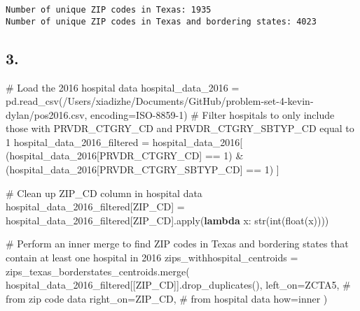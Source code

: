 \documentclass[
  letterpaper,
  DIV=11,
  numbers=noendperiod]{scrartcl}
\newenvironment{Shaded}{\begin{snugshade}}{\end{snugshade}}
\newcommand{\BuiltInTok}[1]{\textcolor[rgb]{0.00,0.23,0.31}{#1}}
\newcommand{\CommentTok}[1]{\textcolor[rgb]{0.37,0.37,0.37}{#1}}
\newcommand{\DecValTok}[1]{\textcolor[rgb]{0.68,0.00,0.00}{#1}}
\newcommand{\KeywordTok}[1]{\textcolor[rgb]{0.00,0.23,0.31}{\textbf{#1}}}
\newcommand{\NormalTok}[1]{\textcolor[rgb]{0.00,0.23,0.31}{#1}}
\newcommand{\OperatorTok}[1]{\textcolor[rgb]{0.37,0.37,0.37}{#1}}
\newcommand{\StringTok}[1]{\textcolor[rgb]{0.13,0.47,0.30}{#1}}
\begin{document}
\begin{verbatim}
Number of unique ZIP codes in Texas: 1935
Number of unique ZIP codes in Texas and bordering states: 4023
\end{verbatim}

\subsection{3.}\label{section-5}

\begin{Shaded}
\begin{Highlighting}[]
\CommentTok{\# Load the 2016 hospital data}
\NormalTok{hospital\_data\_2016 }\OperatorTok{=}\NormalTok{ pd.read\_csv(}\StringTok{\textquotesingle{}/Users/xiadizhe/Documents/GitHub/problem{-}set{-}4{-}kevin{-}dylan/pos2016.csv\textquotesingle{}}\NormalTok{, encoding}\OperatorTok{=}\StringTok{\textquotesingle{}ISO{-}8859{-}1\textquotesingle{}}\NormalTok{)}
\CommentTok{\# Filter hospitals to only include those with PRVDR\_CTGRY\_CD and PRVDR\_CTGRY\_SBTYP\_CD equal to 1}
\NormalTok{hospital\_data\_2016\_filtered }\OperatorTok{=}\NormalTok{ hospital\_data\_2016[}
\NormalTok{    (hospital\_data\_2016[}\StringTok{\textquotesingle{}PRVDR\_CTGRY\_CD\textquotesingle{}}\NormalTok{] }\OperatorTok{==} \DecValTok{1}\NormalTok{) }\OperatorTok{\&} 
\NormalTok{    (hospital\_data\_2016[}\StringTok{\textquotesingle{}PRVDR\_CTGRY\_SBTYP\_CD\textquotesingle{}}\NormalTok{] }\OperatorTok{==} \DecValTok{1}\NormalTok{)}
\NormalTok{]}

\CommentTok{\# Clean up ZIP\_CD column in hospital data}
\NormalTok{hospital\_data\_2016\_filtered[}\StringTok{\textquotesingle{}ZIP\_CD\textquotesingle{}}\NormalTok{] }\OperatorTok{=}\NormalTok{ hospital\_data\_2016\_filtered[}\StringTok{\textquotesingle{}ZIP\_CD\textquotesingle{}}\NormalTok{].}\BuiltInTok{apply}\NormalTok{(}\KeywordTok{lambda}\NormalTok{ x: }\BuiltInTok{str}\NormalTok{(}\BuiltInTok{int}\NormalTok{(}\BuiltInTok{float}\NormalTok{(x))))}

\CommentTok{\# Perform an inner merge to find ZIP codes in Texas and bordering states that contain at least one hospital in 2016}
\NormalTok{zips\_withhospital\_centroids }\OperatorTok{=}\NormalTok{ zips\_texas\_borderstates\_centroids.merge(}
\NormalTok{    hospital\_data\_2016\_filtered[[}\StringTok{\textquotesingle{}ZIP\_CD\textquotesingle{}}\NormalTok{]].drop\_duplicates(),}
\NormalTok{    left\_on}\OperatorTok{=}\StringTok{\textquotesingle{}ZCTA5\textquotesingle{}}\NormalTok{,  }\CommentTok{\# from zip code data}
\NormalTok{    right\_on}\OperatorTok{=}\StringTok{\textquotesingle{}ZIP\_CD\textquotesingle{}}\NormalTok{,  }\CommentTok{\# from hospital data}
\NormalTok{    how}\OperatorTok{=}\StringTok{\textquotesingle{}inner\textquotesingle{}}
\NormalTok{)}


\end{Highlighting}
\end{Shaded}
\end{document}
